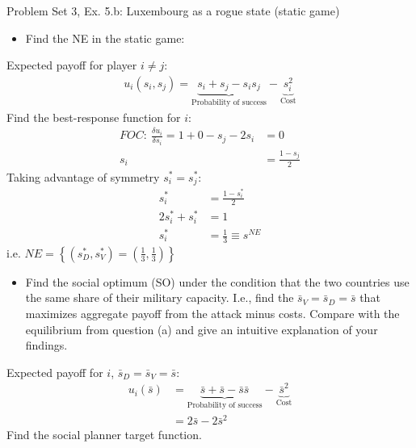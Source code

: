 \begin{frame}{Problem Set 3, Ex. 5.b: Luxembourg as a rogue state (static game)}
  \begin{multicols}{2}
    \begin{itemize}
      \item[(a)] Find the NE in the static game:
    \end{itemize}
    Expected payoff for player $i\neq j$:
    \begin{align*}
      u_i(s_i,s_j)=\underbrace{s_i+s_j-s_is_j}_\text{Probability of success}-\underbrace{s_i^2}_\text{Cost}
    \end{align*}
    Find the best-response function for $i$:
    \begin{align*}
      FOC:\ \frac{\delta u_i}{\delta s_i}=1+0-s_j-2s_i&=0\\
       s_i&=\frac{1-s_j}{2}
    \end{align*}
    Taking advantage of symmetry $s_i^{*}=s_j^{*}$:
    \begin{align*}
       s_i^{*}&=\frac{1-s_i^{*}}{2}\\
      2s_i^{*}+s_i^{*}&=1\\
       s_i^{*}&=\frac{1}{3}\equiv s^{NE}
    \end{align*}
    i.e. $NE=\left\{(s_D^{*},s_V^{*})=(\frac{1}{3},\frac{1}{3})\right\}$
  \vfill\null\columnbreak
    \begin{itemize}
      \item[(b)] Find the social optimum (SO) under the condition that the two countries use the same share of their military capacity. I.e., find the $\bar{s}_V=\bar{s}_D=\bar{s}$ that maximizes aggregate payoff from the attack minus costs. Compare with the equilibrium from question (a) and give an intuitive explanation of your findings.
    \end{itemize}
    Expected payoff for $i$, $\bar{s}_D=\bar{s}_V=\bar{s}$:
    \begin{align*}
      u_i(\bar{s})&=\underbrace{\bar{s}+\bar{s}-\bar{s}\bar{s}}_\text{Probability of success}-\underbrace{\bar{s}^2}_\text{Cost}\\
                  &=2\bar{s}-2\bar{s}^2
    \end{align*}
    Find the social planner target function.
  \vfill\null
  \end{multicols}
\end{frame}
